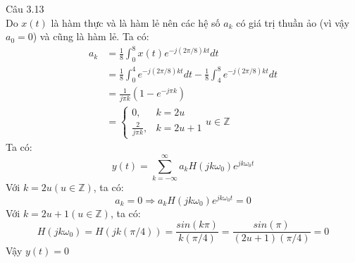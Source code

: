 \documentclass[11pt]{exam}
\begin{document}
\begin{questions}
\question Câu 3.13 \\
    Do $x(t)$ là hàm thực và là hàm lẻ nên các hệ số $a_k$ có giá trị thuần ảo (vì vậy $a_0 = 0$) và cũng là hàm lẻ. Ta có:
    \begin{equation*}
        \begin{aligned}
            a_k & = \frac{1}{8}\int_0^8{x(t)e^{-j(2\pi/8)kt}dt} \\
           & = \frac{1}{8}\int_0^4{e^{-j(2\pi/8)kt}dt} - \frac{1}{8}\int_4^8{e^{-j(2\pi/8)kt}dt} \\
           & = \frac{1}{j\pi k}\left(1 - e^{-j\pi k}\right) \\
           & = 
           \begin{cases}
               0, & k=2u  \\
               \frac{2}{j\pi k}, & k=2u+1
           \end{cases} u \in \mathbb{Z}
        \end{aligned}
    \end{equation*}
    Ta có:
    \begin{equation*}
        y(t) = \sum_{k = -\infty}^{\infty}{a_k H(jk\omega_0)e^{jk\omega_0t}}
    \end{equation*}
    Với $k = 2u (u \in \mathbb{Z})$, ta có:
    \begin{equation*}
        a_k = 0 \Rightarrow a_k H(jk\omega_0)e^{jk\omega_0t} = 0
    \end{equation*}
    Với $k = 2u+1 (u\in \mathbb{Z})$, ta có:
    \begin{equation*}
        H(jk\omega_0) = H(jk(\pi/4)) = \frac{sin(k\pi)}{k(\pi/4)} = \frac{sin(\pi)}{(2u+1)(\pi/4)} = 0
    \end{equation*}
    Vậy $y(t) = 0$


\end{questions}
\end{document}
